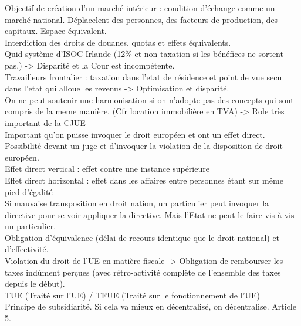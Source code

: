 \documentclass{book}
\begin{document}
Objectif de création d'un marché intérieur : condition d'échange comme un marché national. Déplacelent des personnes, des facteurs de production, des capitaux. Espace équivalent. \\

Interdiction des droits de douanes, quotas et effets équivalents.\\

Quid système d'ISOC Irlande (12\% et non taxation si les bénéfices ne sortent pas.) -> Disparité et la Cour est incompétente.\\

Travailleurs frontalier : taxation dans l'etat de résidence et point de vue secu dans l'etat qui alloue les revenus -> Optimisation et disparité.\\

On ne peut soutenir une harmonisation si on n'adopte pas des concepts qui sont compris de la meme manière. (Cfr location immobilière en TVA) -> Role très important de la CJUE\\

Important qu'on puisse invoquer le droit européen et ont un effet direct. Possibilité devant un juge et d'invoquer la violation de la disposition de droit européen.\\

Effet direct vertical : effet contre une instance supérieure\\

Effet direct horizontal : effet dans les affaires entre personnes étant sur même pied d'égalité\\

Si mauvaise transposition en droit nation, un particulier peut invoquer la directive pour se voir appliquer la directive. Mais l'Etat ne peut le faire vis-à-vis un particulier.\\

Obligation d'équivalence (délai de recours identique que le droit national) et d'effectivité.\\

Violation du droit de l'UE en matière fiscale -> Obligation de rembourser les taxes indûment perçues (avec rétro-activité complète de l'ensemble des taxes depuis le début).\\

TUE (Traité sur l'UE) / TFUE (Traité sur le fonctionnement de l'UE)\\

Principe de subsidiarité. Si cela va mieux en décentralisé, on décentralise. Article 5.
  
\end{document}
